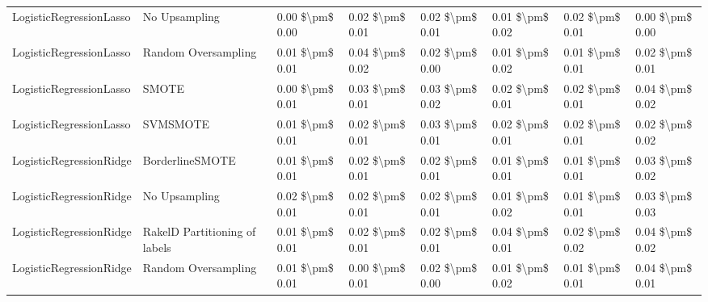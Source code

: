 \begin{tabular}{llllllll}
        LogisticRegressionLasso &                 No Upsampling & 0.00 \$\textbackslash pm\$ 0.00 &           0.02 \$\textbackslash pm\$ 0.01 &       0.02 \$\textbackslash pm\$ 0.01 &        0.01 \$\textbackslash pm\$ 0.02 &                         0.02 \$\textbackslash pm\$ 0.01 &     0.00 \$\textbackslash pm\$ 0.00 \\
        LogisticRegressionLasso &           Random Oversampling & 0.01 \$\textbackslash pm\$ 0.01 &           0.04 \$\textbackslash pm\$ 0.02 &       0.02 \$\textbackslash pm\$ 0.00 &        0.01 \$\textbackslash pm\$ 0.02 &                         0.01 \$\textbackslash pm\$ 0.01 &     0.02 \$\textbackslash pm\$ 0.01 \\
        LogisticRegressionLasso &                         SMOTE & 0.00 \$\textbackslash pm\$ 0.01 &           0.03 \$\textbackslash pm\$ 0.01 &       0.03 \$\textbackslash pm\$ 0.02 &        0.02 \$\textbackslash pm\$ 0.01 &                         0.02 \$\textbackslash pm\$ 0.01 &     0.04 \$\textbackslash pm\$ 0.02 \\
        LogisticRegressionLasso &                      SVMSMOTE & 0.01 \$\textbackslash pm\$ 0.01 &           0.02 \$\textbackslash pm\$ 0.01 &       0.03 \$\textbackslash pm\$ 0.01 &        0.02 \$\textbackslash pm\$ 0.01 &                         0.02 \$\textbackslash pm\$ 0.01 &     0.02 \$\textbackslash pm\$ 0.02 \\
        LogisticRegressionRidge &               BorderlineSMOTE & 0.01 \$\textbackslash pm\$ 0.01 &           0.02 \$\textbackslash pm\$ 0.01 &       0.02 \$\textbackslash pm\$ 0.01 &        0.01 \$\textbackslash pm\$ 0.01 &                         0.01 \$\textbackslash pm\$ 0.01 &     0.03 \$\textbackslash pm\$ 0.02 \\
        LogisticRegressionRidge &                 No Upsampling & 0.02 \$\textbackslash pm\$ 0.01 &           0.02 \$\textbackslash pm\$ 0.01 &       0.02 \$\textbackslash pm\$ 0.01 &        0.01 \$\textbackslash pm\$ 0.02 &                         0.01 \$\textbackslash pm\$ 0.01 &     0.03 \$\textbackslash pm\$ 0.03 \\
        LogisticRegressionRidge & RakelD Partitioning of labels & 0.01 \$\textbackslash pm\$ 0.01 &           0.02 \$\textbackslash pm\$ 0.01 &       0.02 \$\textbackslash pm\$ 0.01 &        0.04 \$\textbackslash pm\$ 0.01 &                         0.02 \$\textbackslash pm\$ 0.02 &     0.04 \$\textbackslash pm\$ 0.02 \\
        LogisticRegressionRidge &           Random Oversampling & 0.01 \$\textbackslash pm\$ 0.01 &           0.00 \$\textbackslash pm\$ 0.01 &       0.02 \$\textbackslash pm\$ 0.00 &        0.01 \$\textbackslash pm\$ 0.02 &                         0.01 \$\textbackslash pm\$ 0.01 &     0.04 \$\textbackslash pm\$ 0.01 \\

\end{tabular}
